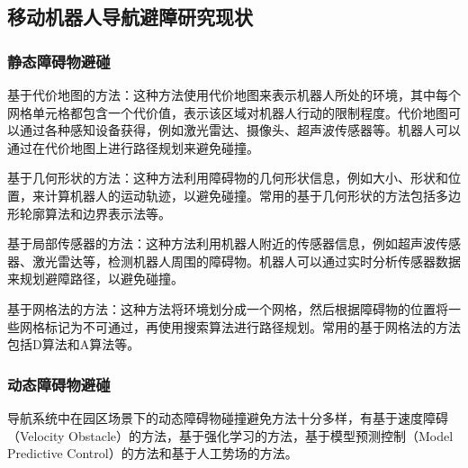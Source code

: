 \subsection{移动机器人导航避障研究现状}
\subsubsection{静态障碍物避碰}
基于代价地图的方法：这种方法使用代价地图来表示机器人所处的环境，其中每个网格单元格都包含一个代价值，表示该区域对机器人行动的限制程度。代价地图可以通过各种感知设备获得，例如激光雷达、摄像头、超声波传感器等。机器人可以通过在代价地图上进行路径规划来避免碰撞。

基于几何形状的方法：这种方法利用障碍物的几何形状信息，例如大小、形状和位置，来计算机器人的运动轨迹，以避免碰撞。常用的基于几何形状的方法包括多边形轮廓算法和边界表示法等。

基于局部传感器的方法：这种方法利用机器人附近的传感器信息，例如超声波传感器、激光雷达等，检测机器人周围的障碍物。机器人可以通过实时分析传感器数据来规划避障路径，以避免碰撞。

基于网格法的方法：这种方法将环境划分成一个网格，然后根据障碍物的位置将一些网格标记为不可通过，再使用搜索算法进行路径规划。常用的基于网格法的方法包括D算法和A算法等。

\subsubsection{动态障碍物避碰}
导航系统中在园区场景下的动态障碍物碰撞避免方法十分多样，有基于速度障碍（Velocity Obstacle）的方法，基于强化学习的方法，基于模型预测控制（Model Predictive Control）的方法和基于人工势场的方法。

